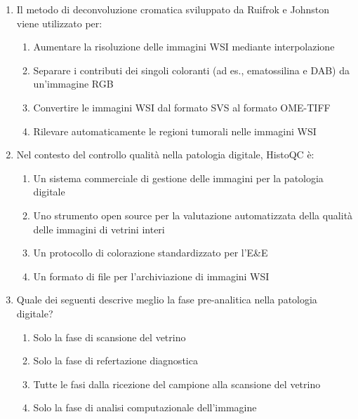 \begin{enumerate}
    \item \label{ch2:q4} Il metodo di deconvoluzione cromatica sviluppato da Ruifrok e Johnston
    viene utilizzato per:
    \begin{enumerate}[label=\Alph*.]
        \item Aumentare la risoluzione delle immagini WSI mediante interpolazione
        \item Separare i contributi dei singoli coloranti (ad es., ematossilina e DAB) da
        un'immagine RGB
        \item Convertire le immagini WSI dal formato SVS al formato OME-TIFF
        \item Rilevare automaticamente le regioni tumorali nelle immagini WSI
    \end{enumerate}

    \item \label{ch2:q5} Nel contesto del controllo qualità nella patologia digitale, HistoQC è:
    \begin{enumerate}[label=\Alph*.]
        \item Un sistema commerciale di gestione delle immagini per la patologia digitale
        \item Uno strumento open source per la valutazione automatizzata della qualità delle
        immagini di vetrini interi
        \item Un protocollo di colorazione standardizzato per l'E\&E
        \item Un formato di file per l'archiviazione di immagini WSI
    \end{enumerate}

    \item \label{ch2:q6} Quale dei seguenti descrive meglio la fase pre-analitica nella patologia
    digitale?
    \begin{enumerate}[label=\Alph*.]
        \item Solo la fase di scansione del vetrino
        \item Solo la fase di refertazione diagnostica
        \item Tutte le fasi dalla ricezione del campione alla scansione del vetrino
        \item Solo la fase di analisi computazionale dell'immagine
    \end{enumerate}


\end{enumerate}
